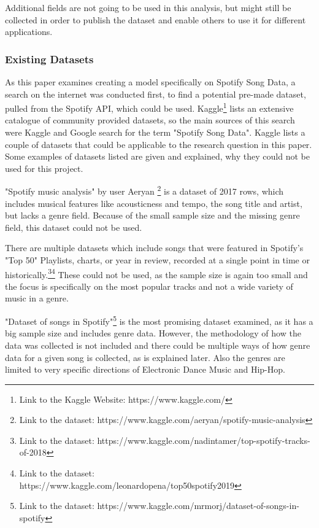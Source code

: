 Additional fields are not going to be used in this analysis, but might still be collected in order to
publish the dataset and enable others to use it for different applications.

\subsubsection{Existing Datasets}

As this paper examines creating a model specifically on Spotify Song Data,
a search on the internet was conducted first, to find a potential pre-made dataset,
pulled from the Spotify \ac{API}, which could be used.
Kaggle\footnote{Link to the Kaggle Website: https://www.kaggle.com/} lists an extensive
catalogue of community provided datasets, so the main sources of this search were
Kaggle and Google search for the term "Spotify Song Data".
Kaggle lists a couple of datasets that could be applicable to the research question in
this paper. Some examples of datasets listed are given and explained, why they could not 
be used for this project.

"Spotify music analysis" by user Aeryan \footnote{Link to the dataset: https://www.kaggle.com/aeryan/spotify-music-analysis}
is a dataset of 2017 rows, which includes musical features like acousticness and tempo,
the song title and artist, but lacks a genre field. Because of the small sample size
and the missing genre field, this dataset could not be used.

There are multiple datasets which include songs that were featured in Spotify's "Top 50" Playlists,
charts, or year in review, recorded at a single point in time or historically.\footnote{Link to the dataset: https://www.kaggle.com/nadintamer/top-spotify-tracks-of-2018}\footnote{Link to the dataset: https://www.kaggle.com/leonardopena/top50spotify2019}
These could not be used, as the sample size is again too small and the focus is specifically
on the most popular tracks and not a wide variety of music in a genre.

"Dataset of songs in Spotify"\footnote{Link to the dataset: https://www.kaggle.com/mrmorj/dataset-of-songs-in-spotify}
is the most promising dataset examined, as it has a big sample size and includes genre data.
However, the methodology of how the data was collected is not included and there
could be multiple ways of how genre data for a given song is collected, as is explained later.
Also the genres are limited to very specific directions of Electronic Dance Music and Hip-Hop.

